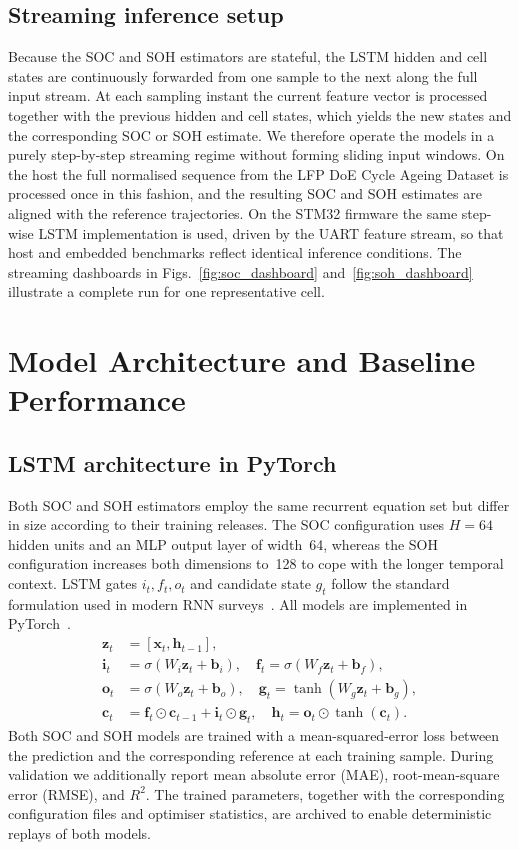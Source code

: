 \documentclass[final,3p,times]{elsarticle}
\begin{document}
\subsection{Streaming inference setup}
Because the SOC and SOH estimators are stateful, the LSTM hidden and cell states are continuously forwarded from one sample to the next along the full input stream. At each sampling instant the current feature vector is processed together with the previous hidden and cell states, which yields the new states and the corresponding SOC or SOH estimate. We therefore operate the models in a purely step-by-step streaming regime without forming sliding input windows. On the host the full normalised sequence from the LFP DoE Cycle Ageing Dataset is processed once in this fashion, and the resulting SOC and SOH estimates are aligned with the reference trajectories. On the STM32 firmware the same step-wise LSTM implementation is used, driven by the UART feature stream, so that host and embedded benchmarks reflect identical inference conditions. The streaming dashboards in Figs.~\ref{fig:soc_dashboard} and~\ref{fig:soh_dashboard} illustrate a complete run for one representative cell.
\section{Model Architecture and Baseline Performance}
\subsection{LSTM architecture in PyTorch}
Both SOC and SOH estimators employ the same recurrent equation set but differ in size according to their training releases. The SOC configuration uses $H=64$ hidden units and an MLP output layer of width~64, whereas the SOH configuration increases both dimensions to~128 to cope with the longer temporal context. LSTM gates $i_t,f_t,o_t$ and candidate state $g_t$ follow the standard formulation used in modern RNN surveys~\cite{liptonCriticalReviewRecurrent2015}. All models are implemented in PyTorch~\cite{paszkePyTorchImperativeStyle2019}.
\begin{align}
    \mathbf{z}_t &= [\mathbf{x}_t,\mathbf{h}_{t-1}],\\
    \mathbf{i}_t &= \sigma(W_i \mathbf{z}_t + \mathbf{b}_i), \quad
    \mathbf{f}_t = \sigma(W_f \mathbf{z}_t + \mathbf{b}_f), \nonumber\\
    \mathbf{o}_t &= \sigma(W_o \mathbf{z}_t + \mathbf{b}_o), \quad
    \mathbf{g}_t = \tanh(W_g \mathbf{z}_t + \mathbf{b}_g), \nonumber\\
    \mathbf{c}_t &= \mathbf{f}_t \odot \mathbf{c}_{t-1} + \mathbf{i}_t \odot \mathbf{g}_t,\quad
    \mathbf{h}_t = \mathbf{o}_t \odot \tanh(\mathbf{c}_t). \nonumber
\end{align}
Both SOC and SOH models are trained with a mean-squared-error loss between the prediction and the corresponding reference at each training sample. During validation we additionally report mean absolute error (MAE), root-mean-square error (RMSE), and $R^2$. The trained parameters, together with the corresponding configuration files and optimiser statistics, are archived to enable deterministic replays of both models.
\end{document}
